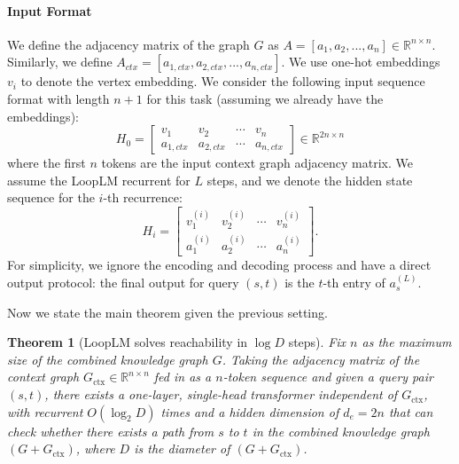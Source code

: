 \documentclass[]{bytedance_seed}
\newcommand{\R}{\mathbb{R}}
\newcommand{\1}{\mathbf{1}}
\newtheorem{theorem}{Theorem}
\newcommand{\ut}{LoopLM}
\begin{document}
\paragraph{Input Format} We define the adjacency matrix of the graph $G$ as $A=[a_1,a_2,...,a_n]\in\R^{n\times n}$. Similarly, we define $A_{ctx}=[a_{1,ctx},a_{2,ctx},...,a_{n,ctx}]$. We use one-hot embeddings $v_i$ to denote the vertex embedding. We consider the following input sequence format with length $n+1$ for this task (assuming we already have the embeddings): 
$$H_0=\begin{bmatrix}
    v_1 &v_2&\cdots&v_n\\
    a_{1,ctx}&a_{2,ctx}&\cdots&a_{n,ctx}\end{bmatrix}\in \R^{2n\times n}$$
where the first $n$ tokens are the input context graph adjacency matrix. 
We assume the \ut{} recurrent for $L$ steps, and we denote the hidden state sequence for the $i$-th recurrence:
$$H_i=\begin{bmatrix}
    v_1^{(i)} &v_2^{(i)}&\cdots&v_n^{(i)}\\
    a_{1}^{(i)}&a_{2}^{(i)}&\cdots&a_{n}^{(i)}\end{bmatrix}.$$
For simplicity, we ignore the encoding and decoding process and have a direct output protocol: the final output for query $(s,t)$ is the $t$-th entry of $a_{s}^{(L)}$. 

Now we state the main theorem given the previous setting.
\begin{theorem}[\ut{} solves reachability in $\log D$ steps]
    \label{appendix_thm:ut_graph_connectivity}
    Fix $n$ as the maximum size of the combined knowledge graph $G$. Taking the adjacency matrix of the context graph $G_{\text{ctx}}\in \R^{n\times n}$ fed in as a $n$-token sequence and given a query pair $(s,t)$, there exists a one-layer, single-head transformer independent of $G_{\text{ctx}}$, with recurrent $O(\log_2 D)$ times and a hidden dimension of $d_e=2n$ that can check whether there exists a path from $s$ to $t$ in the combined knowledge graph $(G+G_{\text{ctx}})$, where $D$ is the diameter of $(G+G_{\text{ctx}})$.
\end{theorem}
\end{document}
